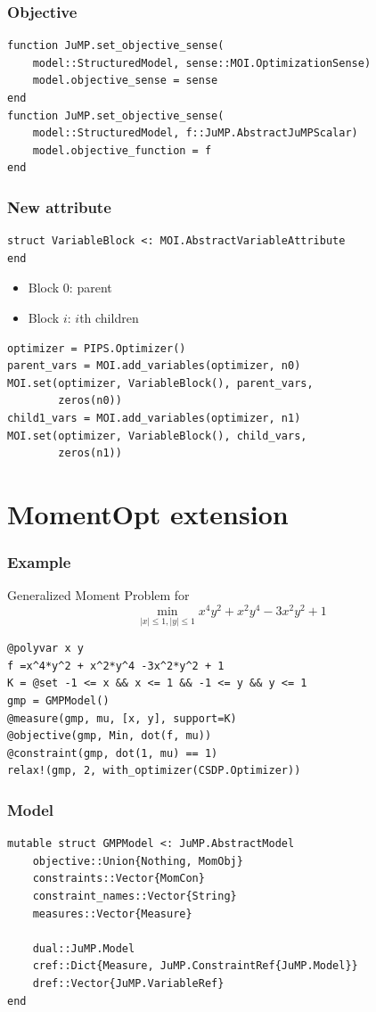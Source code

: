 \documentclass{beamer}
\begin{document}
\begin{frame}[fragile]
  \frametitle{Objective}
  \begin{verbatim}
function JuMP.set_objective_sense(
    model::StructuredModel, sense::MOI.OptimizationSense)
    model.objective_sense = sense
end
function JuMP.set_objective_sense(
    model::StructuredModel, f::JuMP.AbstractJuMPScalar)
    model.objective_function = f
end
  \end{verbatim}
\end{frame}

\begin{frame}[fragile]
  \frametitle{New attribute}
  \begin{verbatim}
struct VariableBlock <: MOI.AbstractVariableAttribute
end
  \end{verbatim}
  \begin{itemize}
    \item Block 0: parent
    \item Block $i$: $i$th children
  \end{itemize}
  \begin{verbatim}
optimizer = PIPS.Optimizer()
parent_vars = MOI.add_variables(optimizer, n0)
MOI.set(optimizer, VariableBlock(), parent_vars,
        zeros(n0))
child1_vars = MOI.add_variables(optimizer, n1)
MOI.set(optimizer, VariableBlock(), child_vars,
        zeros(n1))
  \end{verbatim}
\end{frame}

\section{MomentOpt extension}

\begin{frame}[fragile]
  \frametitle{Example}
  Generalized Moment Problem for
  $$\min_{|x| \le 1, |y| \le 1} x^4y^2 + x^2y^4 -3x^2y^2 + 1$$
  \begin{verbatim}
@polyvar x y
f =x^4*y^2 + x^2*y^4 -3x^2*y^2 + 1
K = @set -1 <= x && x <= 1 && -1 <= y && y <= 1
gmp = GMPModel()
@measure(gmp, mu, [x, y], support=K)
@objective(gmp, Min, dot(f, mu))
@constraint(gmp, dot(1, mu) == 1)
relax!(gmp, 2, with_optimizer(CSDP.Optimizer))
  \end{verbatim}
\end{frame}

\begin{frame}[fragile]
  \frametitle{Model}
  \begin{verbatim}
mutable struct GMPModel <: JuMP.AbstractModel
    objective::Union{Nothing, MomObj}
    constraints::Vector{MomCon}
    constraint_names::Vector{String}
    measures::Vector{Measure}

    dual::JuMP.Model
    cref::Dict{Measure, JuMP.ConstraintRef{JuMP.Model}}
    dref::Vector{JuMP.VariableRef}
end
  \end{verbatim}
\end{frame}
\end{document}
